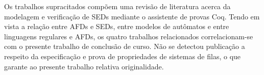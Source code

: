Os trabalhos supracitados compõem uma revisão de literatura acerca da modelagem e verificação de SEDs mediante o assistente de provas Coq. Tendo em vista a relação entre AFDs e SEDs, entre modelos de autômatos e entre linguagens regulares e AFDs, os quatro trabalhos relacionados correlacionam-se com o presente trabalho de conclusão de curso. Não se detectou publicação a respeito da especificação e prova de propriedades de sistemas de filas, o que garante ao presente trabalho relativa originalidade.